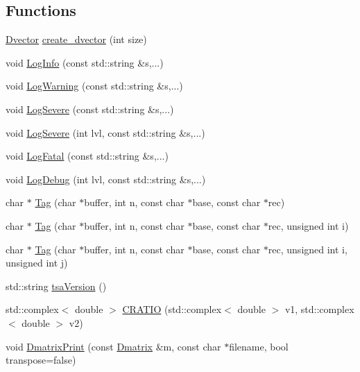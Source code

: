 \subsection*{Functions}
\begin{DoxyCompactItemize}
\item 
\hyperlink{namespacetsa_a8900fb03d849baf447a1a0efe2561fb2}{Dvector} \hyperlink{namespacetsa_a1f1681e991b47cfe3bc50282c96bd744}{create\+\_\+dvector} (int size)
\item 
void \hyperlink{namespacetsa_a08952ac2e7ac6e538c83692501aed4e7}{Log\+Info} (const std\+::string \&s,...)
\item 
void \hyperlink{namespacetsa_a91d266348bcf69ab00c97a253b0ec790}{Log\+Warning} (const std\+::string \&s,...)
\item 
void \hyperlink{namespacetsa_a3bce10382fbb41b48aca0e5b8afeb896}{Log\+Severe} (const std\+::string \&s,...)
\item 
void \hyperlink{namespacetsa_aeff53394d3502127b84380cceb41cba8}{Log\+Severe} (int lvl, const std\+::string \&s,...)
\item 
void \hyperlink{namespacetsa_a0314b9c30387b942a5de0ec7ff3026e3}{Log\+Fatal} (const std\+::string \&s,...)
\item 
void \hyperlink{namespacetsa_a2a922785b9b967a8e92ded5a1540688f}{Log\+Debug} (int lvl, const std\+::string \&s,...)
\item 
char $\ast$ \hyperlink{namespacetsa_afb13ed99dfd49fe21c248464155e8806}{Tag} (char $\ast$buffer, int n, const char $\ast$base, const char $\ast$rec)
\item 
char $\ast$ \hyperlink{namespacetsa_a1079ab07e72bc3aaa35f2a9fce42cbd9}{Tag} (char $\ast$buffer, int n, const char $\ast$base, const char $\ast$rec, unsigned int i)
\item 
char $\ast$ \hyperlink{namespacetsa_a1b02aafe1625f78174f56249e0ec5d34}{Tag} (char $\ast$buffer, int n, const char $\ast$base, const char $\ast$rec, unsigned int i, unsigned int j)
\item 
std\+::string \hyperlink{namespacetsa_a13bdf484592d9055ad57ffbb8f5b1b7f}{tsa\+Version} ()
\item 
std\+::complex$<$ double $>$ \hyperlink{namespacetsa_a0aaa10e21d0123ff3f13680f0c125e19}{C\+R\+A\+T\+IO} (std\+::complex$<$ double $>$ v1, std\+::complex$<$ double $>$ v2)
\item 
void \hyperlink{namespacetsa_ae15dd89a370a611b23e85adea9ed416d}{Dmatrix\+Print} (const \hyperlink{namespacetsa_ad260cd21c1891c4ed391fe788569aba4}{Dmatrix} \&m, const char $\ast$filename, bool transpose=false)

\end{DoxyCompactItemize}
